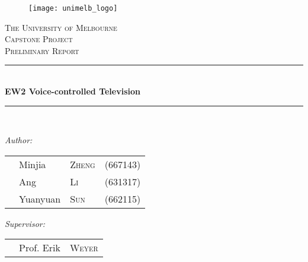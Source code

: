 \begin{titlepage}

\newcommand{\HRule}{\rule{\linewidth}{0.5mm}} %

\center %
 

\begin{figure}[H]
\centering
\texttt{[image: unimelb\_logo]}
\end{figure}
\textsc{\LARGE The University of Melbourne}\\[1.5cm] %
\textsc{\Large Capstone Project}\\[0.5cm] %
\textsc{\large Preliminary Report}\\[0.5cm] %


\HRule \\[0.8cm]
{\LARGE \bfseries EW2 Voice-controlled Television}\\[0.4cm] %
\HRule \\[1.5cm]


\begin{flushleft} \large
\emph{Author:}\\
\begin{tabular}{llll}
&Minjia		&\textsc{Zheng}	&(667143)\\
&Ang		&\textsc{Li}	&(631317)\\
&Yuanyuan	&\textsc{Sun}	&(662115)
\end{tabular}
\end{flushleft}

\begin{flushleft} \large
\emph{Supervisor:} \\
\begin{tabular}{lll}
&Prof. Erik &\textsc{Weyer}
\end{tabular}
\end{flushleft}


\end{titlepage}
